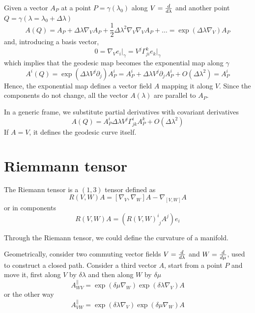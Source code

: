     Given a vector $A_P$ at a point $P = \gamma(\lambda_0)$ along $V = \frac{d}{d\lambda}$ and another point $Q = \gamma(\lambda = \lambda_0 + \Delta \lambda)$ 
    \begin{equation*}
        A(Q) = A_P + \Delta \lambda \nabla_V A_P + \frac{1}{2} \Delta \lambda^2 \nabla_V \nabla_V A_P + \ldots = \exp(\Delta \lambda \nabla_V) A_P
    \end{equation*}
    and, introducing a basis vector, 
    \begin{equation*}
        0 = \nabla_V e_i \vert_\gamma = V^j \Gamma^k_{ji} e_k \vert_\gamma 
    \end{equation*}
    which implies that the geodesic map becomes the exponential map along $\gamma$ 
    \begin{equation*}
        A^i(Q) = \exp(\Delta \lambda V^j \partial_j) A^i_P = A^i_P + \Delta \lambda V^j \partial_j A^i_P + O(\Delta \lambda^2) = A^i_P
    \end{equation*}
    Hence, the exponential map defines a vector field $A$ mapping it along $V$. Since the components do not change, all the vector $A(\lambda)$ are parallel to $A_P$.

    In a generic frame, we substitute partial derivatives with covariant derivatives
    \begin{equation*}
        A(Q) = A^i_P \Delta \lambda V^j \Gamma^i_{jk} A^k_P + O(\Delta \lambda^2) 
    \end{equation*}
    If $A = V$, it defines the geodesic curve itself.

\chapter{Riemmann tensor}

    \begin{definition}
        The Riemann tensor is a $(1,3)$ tensor defined as 
        \begin{equation*}
            R(V,W) A = [\nabla_V, \nabla_W] A - \nabla_{[V,W]} A
        \end{equation*}
        or in components 
        \begin{equation*}
            R(V, W) A = (R(V,W)^i_{\phantom i j} A^j) e_i
        \end{equation*}
    \end{definition}

    Through the Riemann tensor, we could define the curvature of a manifold.

    Geometrically, consider two commuting vector fields $V = \frac{d}{d\lambda}$ and $W = \frac{d}{d\mu}$, used to construct a closed path. Consider a third vector $A$, start from a point $P$ and move it, first along $V$ by $\delta \lambda$ and then along $W$ by $\delta \mu$
    \begin{equation*}
        A^\parallel_{WV} = \exp(\delta \mu \nabla_W) \exp(\delta \lambda \nabla_V) A
    \end{equation*}
    or the other way 
    \begin{equation*}
        A^\parallel_{VW} = \exp(\delta \lambda \nabla_V) \exp(\delta \mu \nabla_W)  A
    \end{equation*}

